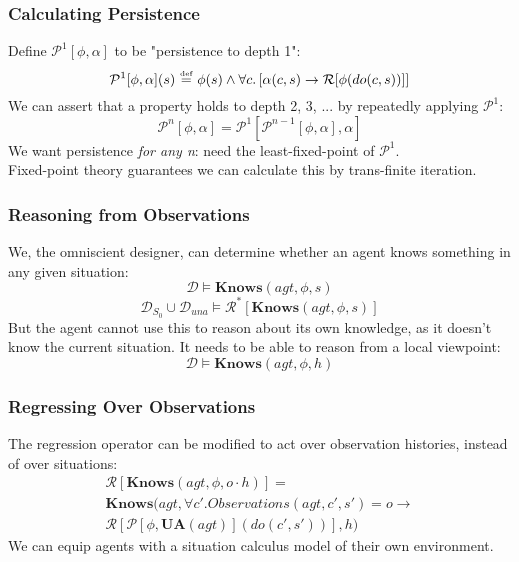 \documentclass{beamer}
\newcommand{\isdef}{\hbox{$\stackrel{\mbox{\tiny def}}{=}$}}
\begin{document}
\begin{frame}
\frametitle{Calculating Persistence}
Define $\mathcal{P}^{1}[\phi,\alpha]$ to be "persistence to depth 1":
\begin{equation*}
  \mathcal{P}^{1}[\phi,\alpha](s)\ \isdef\ \phi(s) \wedge \forall c . \left[\alpha(c,s) \rightarrow \mathcal{R}[\phi(do(c,s))]\right]
\end{equation*}
We can assert that a property holds to depth 2, 3, ... by repeatedly applying
$\mathcal{P}^{1}$:
\begin{equation*}
  \mathcal{P}^{n}[\phi,\alpha] = \mathcal{P}^{1}[\mathcal{P}^{n-1}[\phi,\alpha],\alpha]
\end{equation*}
We want persistence \emph{for any n}:  need the least-fixed-point of $\mathcal{P}^{1}$. \\
Fixed-point theory guarantees we can calculate this by trans-finite iteration.
\end{frame}

\begin{frame}
\frametitle{Reasoning from Observations}
We, the omniscient designer, can determine whether an agent knows something
 in any given situation:
\begin{equation*}
  \mathcal{D} \models \mathbf{Knows}(agt,\phi,s)
\end{equation*}
\begin{equation*}
  \mathcal{D}_{S_0} \cup \mathcal{D}_{una} \models \mathcal{R}^{*}[\mathbf{Knows}(agt,\phi,s)]
\end{equation*}
But the agent cannot use this to reason about its own knowledge, as it doesn't
know the current situation.  It needs to be able to reason from a local
viewpoint:
\begin{equation*}
  \mathcal{D} \models \mathbf{Knows}(agt,\phi,h)
\end{equation*}
\end{frame}

\begin{frame}
\frametitle{Regressing Over Observations}
The regression operator can be modified to act over observation histories,
instead of over situations:
\begin{multline*}
  \mathcal{R}[\mathbf{Knows}(agt,\phi,o \cdot h)] = \\
  \mathbf{Knows}(agt,\forall c' . Observations(agt,c',s')=o \rightarrow \\
     \mathcal{R}[\mathcal{P}[\phi,\mathbf{UA}(agt)](do(c',s'))],h)
\end{multline*}
We can equip agents with a situation calculus model of their own environment.
\end{frame}
\end{document}

